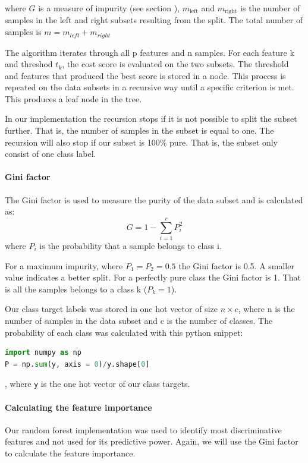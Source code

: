 where $G$ is a measure of impurity (see section ),
$m_{\text{left}} $ and $m_{\text{right}} $ is the number of samples in the left
and right subsets resulting from the split. The total number of samples is $m =
m_{left} + m_{right}  $ 

The algorithm iterates through all p features and n samples. For each feature k
and threshod $t_k$, the cost score is evaluated on the two subsets. The
threshold and features that produced the best score is stored in a node. This
process is repeated on the data subsets in a recursive way until a specific
criterion is met. This produces a leaf node in the tree. 

In our implementation the recursion stops if it is not possible to split the
subset further. That is, the number of samples in the subset is equal to one.   
The recursion will also stop if our subset is 100\% pure. That is, the subset
only consist of one class label.  

\paragraph{Gini factor} \label{sec:gini_factor} \hfill

The Gini factor is used to measure the purity of the data subset and is
calculated as:
\begin{equation*}
    G = 1 - \sum_{i=1}^{c} P_i ^2 
\end{equation*}
where $P_i$ is the probability that a sample belongs to class i. 

For a maximum impurity, where $P_1 = P_2 = 0.5$ the Gini factor is 0.5. A
smaller value indicates a better split. For a perfectly pure class the Gini
factor is 1. That is all the samples belongs to a class k ($P_k = 1$).     


Our class target labels was stored in one hot vector of size $n \times c$, 
where n is the number of samples in the data subset and c is the number of
classes. The probability of each class was calculated with this python snippet:
\begin{lstlisting}[language=Python]
import numpy as np
P = np.sum(y, axis = 0)/y.shape[0]
\end{lstlisting},
where \verb|y| is the one hot vector of our class targets. 

\paragraph{Calculating the feature importance} \hfill
Our random forest implementation was used to identify most discriminative
features and not used for its predictive power. Again, we will use the Gini
factor to calculate the feature importance. 


